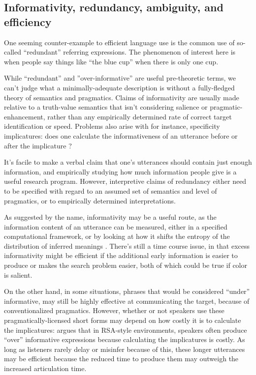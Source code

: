 \documentclass[]{article}
\begin{document}

\subsection{Informativity, redundancy, ambiguity, and efficiency}
One seeming counter-example to efficient language use is the common use of so-called ``redundant'' referring expressions. The phenomenon of interest here is when people say things like ``the blue cup'' when there is only one cup.  

While ``redundant'' and ''over-informative'' are useful pre-theoretic terms, we can't judge what a minimally-adequate description is without a fully-fledged theory of semantics and pragmatics. Claims of informativity are usually made relative to a truth-value semantics that isn't considering salience or pragmatic-enhancement, rather than any empirically determined rate of correct target identification or speed. Problems also arise with for instance, specificity implicatures: does one calculate the informativeness of an utterance before or after the implicature \cite{bergen}?

It's facile to make a verbal claim that %
one's utterances should contain just enough information, and empirically studying how much information people give is a useful research program. However, interpretive claims of redundancy either need to be specified with regard to an assumed set of semantics and level of pragmatics, or to empirically determined interpretations. 

As suggested by the name, informativity may be a useful route, as the information content of an utterance can be measured, either in a specified computational framework, or by looking at how it shifts the entropy of the distribution of inferred meanings \cite{degen20200406}. There's still a time course issue, in that excess informativity might be efficient if the additional early information is easier to produce or makes the search problem easier, both of which could be true if color is salient. 

On the other hand, in some situations, phrases that would be considered ``under'' informative, may still be highly effective at communicating the target, because of conventionalized pragmatics. However, whether or not speakers use these pragmatically-licensed short forms may depend on how costly it is to calculate the implicatures:  \cite{baumann2014} argues that in RSA-style environments, speakers often produce ``over'' informative expressions because calculating the implicatures is costly. As long as listeners rarely delay or misinfer because of this, these longer utterances may be efficient because the reduced time to produce them may outweigh the increased articulation time. 
\end{document}
